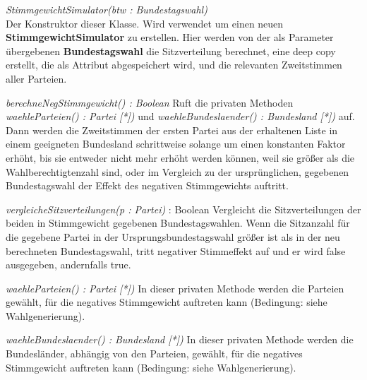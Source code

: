\documentclass[12pt,a4paper,titlepage]{article}
\newcommand{\myma}{\fontfamily{pcr}\selectfont \textbf}
\newcommand{\mymo}{\fontfamily{pcr}\selectfont \textit}
\begin{document}
\begin{description}
\item {\mymo{StimmgewichtSimulator(btw : Bundestagswahl)}} \\
Der Konstruktor dieser Klasse. Wird verwendet um einen neuen {\myma{StimmgewichtSimulator}} zu erstellen. Hier werden von der als Parameter übergebenen {\myma{Bundestagswahl}} die Sitzverteilung berechnet, eine deep copy erstellt, die als Attribut abgespeichert wird, und die relevanten Zweitstimmen aller Parteien.
\item {\mymo{berechneNegStimmgewicht() : Boolean}}
Ruft die privaten Methoden {\mymo{waehleParteien() : Partei [*])}} und {\mymo{waehleBundeslaender() : Bundesland [*])}} auf.  Dann werden die Zweitstimmen der ersten Partei aus der erhaltenen Liste in einem geeigneten Bundesland schrittweise solange um einen konstanten Faktor erhöht, bis sie entweder nicht mehr erhöht werden können, weil sie größer als die Wahlberechtigtenzahl sind, oder im Vergleich zu der ursprünglichen, gegebenen Bundestagswahl der Effekt des negativen Stimmgewichts auftritt.

\item {\mymo{vergleicheSitzverteilungen(p : Partei)}} : Boolean
Vergleicht die Sitzverteilungen der beiden in Stimmgewicht gegebenen Bundestagswahlen. Wenn die Sitzanzahl für die gegebene Partei in der Ursprungsbundestagswahl größer ist als in der neu berechneten Bundestagswahl, tritt negativer Stimmeffekt auf und er wird false ausgegeben, andernfalls true. 

\item {\mymo{waehleParteien() : Partei [*])}}
In dieser privaten Methode werden die Parteien gewählt, für die negatives Stimmgewicht auftreten kann (Bedingung: siehe Wahlgenerierung).

\item {\mymo{waehleBundeslaender() : Bundesland [*])}}
In dieser privaten Methode werden die Bundesländer, abhängig von den Parteien, gewählt, für die negatives Stimmgewicht auftreten kann (Bedingung: siehe Wahlgenerierung).



\end{description}


\newpage
\end{document}
